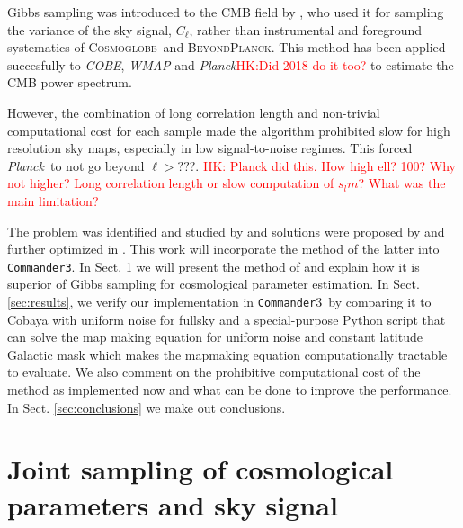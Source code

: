 \documentclass[twocolumn]{../common/aa}
\def\WMAP{\emph{WMAP}}
\def\COBE{\emph{COBE}}
\def\Planck{\emph{Planck}}
\def\commander{\texttt{Commander}}
\def\commanderthree{\texttt{Commander3}}
\newcommand{\BP}{\textsc{BeyondPlanck}}
\newcommand{\cosmoglobe}{\textsc{Cosmoglobe}}
\begin{document}
Gibbs sampling was introduced to the CMB field by \citet{jewell2004}, who used it for sampling the variance of the sky signal, $C_{\ell}$, rather than instrumental and foreground systematics of \cosmoglobe\ and \BP. This method has been applied succesfully to \COBE\citep{wandelt2004}, \WMAP\citep{Eriksen:2007jw} and \Planck\citep{planck2014-a13}\textcolor{red}{HK:Did 2018 do it too?} to estimate the CMB power spectrum.

However, the combination of long correlation length and non-trivial computational cost for each sample made the algorithm prohibited slow for high resolution sky maps, especially in low signal-to-noise regimes. This forced \Planck\ to not go beyond $\ell > ???$. \textcolor{red}{HK: Planck did this. How high ell? 100? Why not higher? Long correlation length or slow computation of $s_lm$? What was the main limitation?}

The problem was identified and studied by \cite{Eriksen:2004ss} and solutions were proposed by \cite{jewell:2009} and further optimized in \citet{racine:2016}. This work will incorporate the method of the latter into \commanderthree. In Sect. \ref{sec:methods} we will present the method of \citet{racine:2016} and explain how it is superior of Gibbs sampling for cosmological parameter estimation. In Sect. \ref{sec:results}, we verify our implementation in \commander3\ by comparing it to Cobaya with uniform noise for fullsky and a special-purpose Python script that can solve the map making equation for uniform noise and constant latitude Galactic mask which makes the mapmaking equation computationally tractable to evaluate. We also comment on the prohibitive computational cost of the method as implemented now and what can be done to improve the performance. In Sect. \ref{sec:conclusions} we make out conclusions.

\section{Joint sampling of cosmological parameters and sky signal}
\label{sec:methods}
\end{document}
